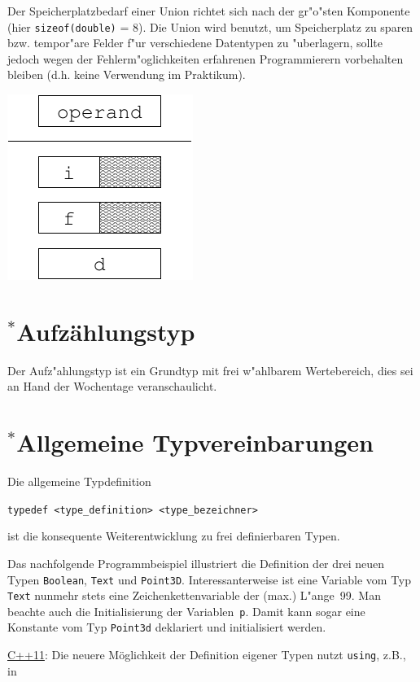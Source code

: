 \begin{minipage}[b]{0.55\textwidth}
Der Speicherplatzbedarf einer Union richtet sich nach der gr"o"sten
Komponente (hier \verb|sizeof(double)| = 8).
Die Union wird benutzt, um Speicherplatz zu sparen
bzw. tempor"are Felder f"ur verschiedene Datentypen zu "uberlagern,
sollte jedoch wegen der Fehlerm"oglichkeiten
erfahrenen Programmierern vorbehalten bleiben
(d.h. keine Verwendung im Praktikum).
\end{minipage}
\hfill
% 
\includegraphics[scale=0.9]{kap530.pdf}
\hfill\mbox{}
%
%
%
%
\section{\mbox{}$^{*}$Aufzählungstyp}
\label{p:5.5}
%
%
Der Aufz"ahlungstyp ist ein Grundtyp mit frei w"ahlbarem Wertebereich,
dies sei an Hand der Wochentage veranschaulicht.
%
%
%
%
\section{\mbox{}$^{*}$Allgemeine Typvereinbarungen}
\label{p:5.6}
%
%
Die allgemeine Typdefinition

\mbox{}\hfill
\verb|typedef <type_definition> <type_bezeichner>|
\hfill\mbox{}

ist die konsequente
Weiterentwicklung zu frei definierbaren Typen.

Das nachfolgende Programmbeispiel illustriert die Definition
der drei neuen Typen \verb|Boolean|,  \verb|Text| und \verb|Point3D|.
%
%
%
Interessanterweise ist eine Variable vom Typ \verb|Text|
nunmehr stets eine Zeichenkettenvariable der (max.) L"ange~99.
Man beachte auch die Initialisierung der Variablen~\verb|p|.
Damit kann sogar eine Konstante vom Typ \verb|Point3d| deklariert
und initialisiert werden.

\underline{C++11}: Die neuere Möglichkeit der Definition eigener Typen nutzt \texttt{using}, 
z.B., in
%
%
